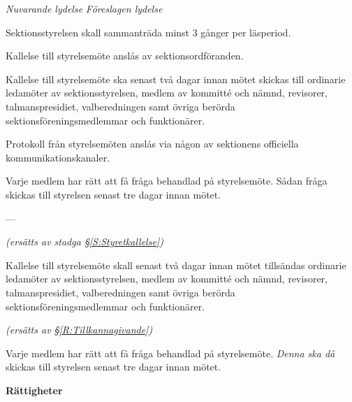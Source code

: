 \documentclass{article}
\newenvironment{lydelse}
    {\begin{paracol}{2}%
        \emph{Nuvarande lydelse}%
        \switchcolumn%
        \emph{Föreslagen lydelse}%
    \end{paracol}%
    \begin{enumerate}[label=\thesubsection.\arabic*]%
    \begin{paracol}{2}%
    }{\end{paracol}\end{enumerate}}
\begin{document}
\begin{lydelse}
    \setcounter{section}{4}
    \setcounter{subsection}{2}
    \setcounter{enumi}{0}
    \item Sektionsstyrelsen skall sammanträda minst 3 gånger per läsperiod.
    
    \item Kallelse till styrelsemöte anslås av sektionsordföranden.

    \item Kallelse till styrelsemöte ska senast två dagar innan mötet skickas till ordinarie ledamöter av sektionsstyrelsen, medlem av kommitté och nämnd, revisorer, talmanspresidiet, valberedningen samt övriga berörda sektionsföreningsmedlemmar och funktionärer.
    
    \item Protokoll från styrelsemöten anslås via någon av sektionens officiella kommunikationskanaler.
	\setcounter{enumi}{8}	
    \item Varje medlem har rätt att få fråga behandlad på styrelsemöte.
    Sådan fråga skickas till styrelsen senast tre dagar innan mötet.
    \switchcolumn
    \setcounter{section}{3}
    \setcounter{subsection}{2}
    \setcounter{enumi}{0}
    \item[] ---
    
	\item[] \emph{(ersätts av stadga \S\ref{S:Styretkallelse})}

	\item Kallelse till styrelsemöte skall senast två dagar innan mötet tillsändas ordinarie ledamöter av sektionsstyrelsen, medlem av kommitté och nämnd, revisorer, talmanspresidiet, valberedningen samt övriga berörda sektionsföreningsmedlemmar och funktionärer.
	
	\item[] \emph{(ersätts av \S \ref{R:Tillkannagivande})}
	
	\item Varje medlem har rätt att få fråga behandlad på styrelsemöte.\emph{ Denna ska då} skickas till styrelsen senast tre dagar innan mötet.
\end{lydelse}
\textbf{Rättigheter}
\end{document}
